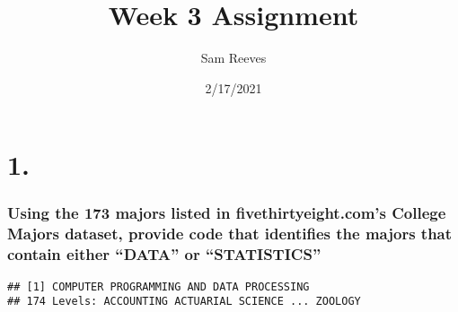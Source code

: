 \documentclass[
]{article}
\title{Week 3 Assignment}
\author{Sam Reeves}
\date{2/17/2021}
\newenvironment{Shaded}{\begin{snugshade}}{\end{snugshade}}
\newcommand{\FunctionTok}[1]{\textcolor[rgb]{0.00,0.00,0.00}{#1}}
\newcommand{\NormalTok}[1]{#1}
\newcommand{\OtherTok}[1]{\textcolor[rgb]{0.56,0.35,0.01}{#1}}
\newcommand{\SpecialCharTok}[1]{\textcolor[rgb]{0.00,0.00,0.00}{#1}}
\newcommand{\StringTok}[1]{\textcolor[rgb]{0.31,0.60,0.02}{#1}}
\begin{document}
\maketitle

\hypertarget{section}{%
\section{1.}\label{section}}

\hypertarget{using-the-173-majors-listed-in-fivethirtyeight.coms-college-majors-dataset-provide-code-that-identifies-the-majors-that-contain-either-data-or-statistics}{%
\subsubsection{Using the 173 majors listed in fivethirtyeight.com's
College Majors dataset, provide code that identifies the majors that
contain either ``DATA'' or
``STATISTICS''}\label{using-the-173-majors-listed-in-fivethirtyeight.coms-college-majors-dataset-provide-code-that-identifies-the-majors-that-contain-either-data-or-statistics}}

\begin{Shaded}
\end{Shaded}

\begin{verbatim}
## [1] COMPUTER PROGRAMMING AND DATA PROCESSING
## 174 Levels: ACCOUNTING ACTUARIAL SCIENCE ... ZOOLOGY
\end{verbatim}

\begin{Shaded}
\end{Shaded}
\end{document}
